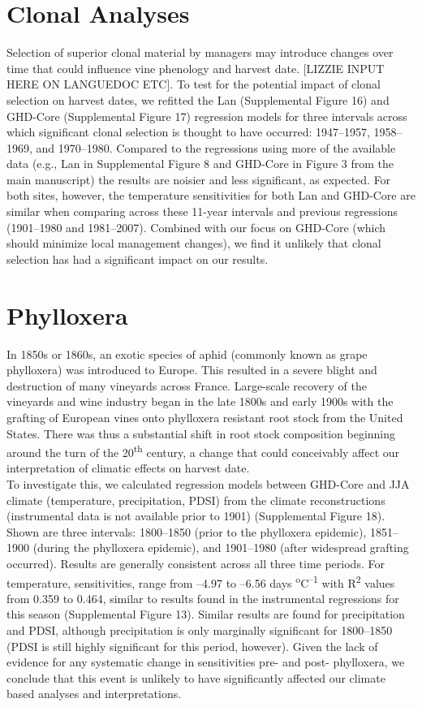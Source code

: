 \documentclass[12pt]{article}
\begin{document}
\section*{Clonal Analyses}
\noindent Selection of superior clonal material by managers may introduce changes over time that could influence vine phenology and harvest date. [LIZZIE INPUT HERE ON LANGUEDOC ETC]. To test for the potential impact of clonal selection on harvest dates, we refitted the Lan (Supplemental Figure 16) and GHD-Core (Supplemental Figure 17) regression models for three intervals across which significant clonal selection is thought to have occurred: 1947--1957, 1958--1969, and 1970--1980. Compared to the regressions using more of the available data (e.g., Lan in Supplemental Figure 8 and GHD-Core in Figure 3 from the main manuscript) the results are noisier and less significant, as expected. For both sites, however, the temperature sensitivities for both Lan and GHD-Core are similar when comparing across these 11-year intervals and previous regressions (1901--1980 and 1981--2007). Combined with our focus on GHD-Core (which should minimize local management changes), we find it unlikely that clonal selection has had a significant impact on our results.

\section*{Phylloxera}
\noindent In 1850s or 1860s, an exotic species of aphid (commonly known as grape phylloxera) was introduced to Europe. This resulted in a severe blight and destruction of many vineyards across France. Large-scale recovery of the vineyards and wine industry began in the late 1800s and early 1900s with the grafting of European vines onto phylloxera resistant root stock from the United States. There was thus a substantial shift in root stock composition beginning around the turn of the 20\textsuperscript{th} century, a change that could conceivably affect our interpretation of climatic effects on harvest date.\\
\indent To investigate this, we calculated regression models between GHD-Core and JJA climate (temperature, precipitation, PDSI) from the climate reconstructions (instrumental data is not available prior to 1901) (Supplemental Figure 18). Shown are three intervals: 1800--1850 (prior to the phylloxera epidemic), 1851--1900 (during the phylloxera epidemic), and 1901--1980 (after widespread grafting occurred). Results are generally consistent across all three time periods. For temperature, sensitivities, range from --4.97 to --6.56 days \textsuperscript{o}C\textsuperscript{--1} with R\textsuperscript{2} values  from 0.359 to 0.464, similar to results found in the instrumental regressions for this season (Supplemental Figure 13). Similar results are found for precipitation and PDSI, although precipitation is only marginally significant for 1800--1850 (PDSI is still highly significant for this period, however). Given the lack of evidence for any systematic change in sensitivities pre- and post- phylloxera, we conclude that this event is unlikely to have significantly affected our climate based analyses and interpretations.
\end{document}
